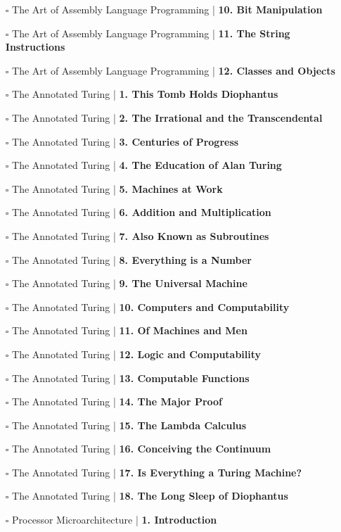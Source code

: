 \documentclass[a4, landscape, 12pt]{article}
\newcommand{\checkbox}{$\square$}%
\begin{document}
\begin{itemize}
{}
\item [\checkbox]  The Art of Assembly Language Programming | \textbf{ 10. Bit Manipulation
}
\item [\checkbox]  The Art of Assembly Language Programming | \textbf{ 11. The String Instructions
}
\item [\checkbox]  The Art of Assembly Language Programming | \textbf{ 12. Classes and Objects
}
\item [\checkbox]  The Annotated Turing | \textbf{ 1. This Tomb Holds Diophantus
}
\item [\checkbox]  The Annotated Turing | \textbf{ 2. The Irrational and the Transcendental
}
\item [\checkbox]  The Annotated Turing | \textbf{ 3. Centuries of Progress
}
\item [\checkbox]  The Annotated Turing | \textbf{ 4. The Education of Alan Turing
}
\item [\checkbox]  The Annotated Turing | \textbf{ 5. Machines at Work
}
\item [\checkbox]  The Annotated Turing | \textbf{ 6. Addition and Multiplication
}
\item [\checkbox]  The Annotated Turing | \textbf{ 7. Also Known as Subroutines
}
\item [\checkbox]  The Annotated Turing | \textbf{ 8. Everything is a Number
}
\item [\checkbox]  The Annotated Turing | \textbf{ 9. The Universal Machine
}
\item [\checkbox]  The Annotated Turing | \textbf{ 10. Computers and Computability
}
\item [\checkbox]  The Annotated Turing | \textbf{ 11. Of Machines and Men
}
\item [\checkbox]  The Annotated Turing | \textbf{ 12. Logic and Computability
}
\item [\checkbox]  The Annotated Turing | \textbf{ 13. Computable Functions
}
\item [\checkbox]  The Annotated Turing | \textbf{ 14. The Major Proof
}
\item [\checkbox]  The Annotated Turing | \textbf{ 15. The Lambda Calculus
}
\item [\checkbox]  The Annotated Turing | \textbf{ 16. Conceiving the Continuum
}
\item [\checkbox]  The Annotated Turing | \textbf{ 17. Is Everything a Turing Machine?
}
\item [\checkbox]  The Annotated Turing | \textbf{ 18. The Long Sleep of Diophantus
}
\item [\checkbox]  Processor Microarchitecture | \textbf{ 1. Introduction
}
\end{itemize}
\end{document}
